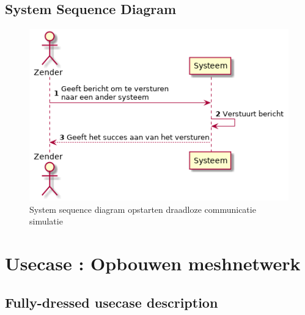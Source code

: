 \documentclass[a4paper, 11pt, oneside]{report}
\begin{document}
\subsection{System Sequence Diagram }
\label{Usecase:communicerendata:systemsequence}

\begin{figure}[H]
	\begin{center}\includegraphics[height=.2\textheight]{UML/out/usecase/sequence/VersturenBericht/VersturenBericht.png}\end{center}
	\caption{System sequence diagram opstarten draadloze communicatie simulatie}
	\label{fig:communicerendata:systemsequence}
\end{figure}

\section[Opbouwen meshnetwerk]{Usecase : Opbouwen meshnetwerk}
\label{Usecase:opbouwenmeshnetwerk}
\subsection{Fully-dressed usecase description}
\end{document}
